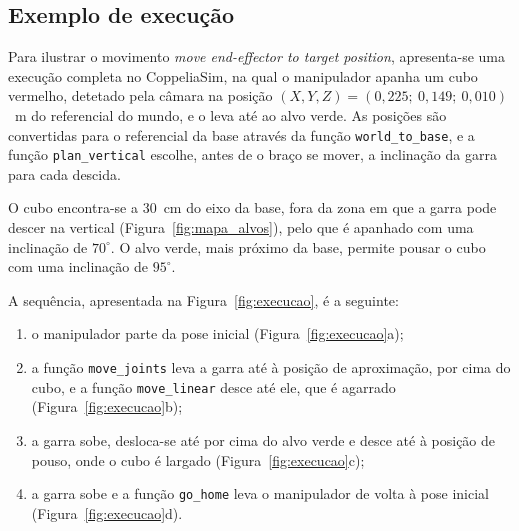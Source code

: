 \subsection{Exemplo de execução}
\label{sec:exemplo_execucao}

Para ilustrar o movimento \textit{move end-effector to target position}, apresenta-se uma execução completa no CoppeliaSim, na qual o manipulador apanha um cubo vermelho, detetado pela câmara na posição $(X, Y, Z) = (0{,}225;\ 0{,}149;\ 0{,}010)$~m do referencial do mundo, e o leva até ao alvo verde. As posições são convertidas para o referencial da base através da função \texttt{world\_to\_base}, e a função \texttt{plan\_vertical} escolhe, antes de o braço se mover, a inclinação da garra para cada descida.

O cubo encontra-se a 30~cm do eixo da base, fora da zona em que a garra pode descer na vertical (Figura~\ref{fig:mapa_alvos}), pelo que é apanhado com uma inclinação de $70^\circ$. O alvo verde, mais próximo da base, permite pousar o cubo com uma inclinação de $95^\circ$.

A sequência, apresentada na Figura~\ref{fig:execucao}, é a seguinte:
\begin{enumerate}
    \item o manipulador parte da pose inicial (Figura~\ref{fig:execucao}a);
    \item a função \texttt{move\_joints} leva a garra até à posição de aproximação, por cima do cubo, e a função \texttt{move\_linear} desce até ele, que é agarrado (Figura~\ref{fig:execucao}b);
    \item a garra sobe, desloca-se até por cima do alvo verde e desce até à posição de pouso, onde o cubo é largado (Figura~\ref{fig:execucao}c);
    \item a garra sobe e a função \texttt{go\_home} leva o manipulador de volta à pose inicial (Figura~\ref{fig:execucao}d).
\end{enumerate}

